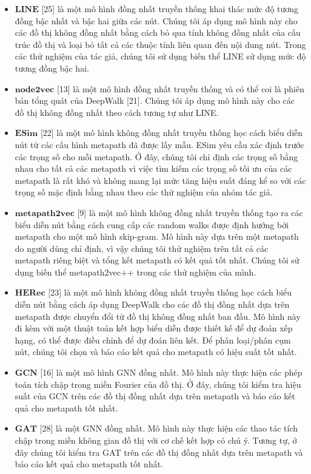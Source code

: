 \begin{itemize}
  \item $\mathbf{LINE}$ [25] là một mô hình đồng nhất truyền thống khai thác mức độ tương đồng bậc nhất và bậc hai giữa các nút. Chúng tôi áp dụng mô hình này cho các đồ thị không đồng nhất bằng cách bỏ qua tính không đồng nhất của cấu trúc đồ thị và loại bỏ tất cả các thuộc tính liên quan đến nội dung nút. Trong các thử nghiệm của tác giả, chúng tôi sử dụng biến thể LINE sử dụng mức độ tương đồng bậc hai.
  \item $\mathbf{node2vec}$ [13] là một mô hình đồng nhất truyền thống và có thể coi là phiên bản tổng quát của DeepWalk [21]. Chúng tôi áp dụng mô hình này cho các đồ thị không đồng nhất theo cách tương tự như LINE.
  \item $\mathbf{ESim}$ [22] là một mô hình không đồng nhất truyền thống học cách biểu diễn nút từ các cấu hình metapath đã được lấy mẫu. ESim yêu cầu xác định trước các trọng số cho mỗi metapath. Ở đây, chúng tôi chỉ định các trọng số bằng nhau cho tất cả các metapath vì việc tìm kiếm  các trọng số tối ưu của các metapath là rất khó và không mang lại mức tăng hiệu suất đáng kể so với các trọng số mặc định bằng nhau theo các thử nghiệm của nhóm tác giả.
  \item $\mathbf{metapath2vec}$ [9] là một mô hình không đồng nhất truyền thống tạo ra các biểu diễn nút bằng cách cung cấp các random walks được định hướng bởi metapath cho một mô hình skip-gram. Mô hình này dựa trên một metapath do người dùng chỉ định, vì vậy chúng tôi thử nghiệm trên tất cả các metapath riêng biệt và tổng kết metapath có kết quả tốt nhất. Chúng tôi sử dụng biến thể metapath2vec++ trong các thử nghiệm của mình. 
  \item $\mathbf{HERec}$ [23] là một mô hình không đồng nhất truyền thống học cách biểu diễn nút bằng cách áp dụng DeepWalk cho các đồ thị đồng nhất dựa trên metapath được chuyển đổi từ đồ thị không đồng nhất ban đầu. Mô hình này đi kèm với một thuật toán kết hợp biểu diễn được thiết kế để dự đoán xếp hạng, có thể được điều chỉnh để dự đoán liên kết. Để phân loại/phân cụm nút, chúng tôi chọn và báo cáo kết quả cho metapath có hiệu suất tốt nhất.
  \item $\mathbf{GCN}$ [16] là một mô hình GNN đồng nhất. Mô hình này thực hiện các phép toán tích chập trong miền Fourier của đồ thị. Ở đây, chúng tôi kiểm tra hiệu suất của GCN trên các đồ thị đồng nhất dựa trên metapath và báo cáo kết quả cho metapath tốt nhất.
  \item $\mathbf{GAT}$ [28] là một GNN đồng nhất. Mô hình này thực hiện các thao tác tích chập trong miền không gian đồ thị với cơ chế kết hợp có chú ý. Tương tự, ở đây chúng tôi kiểm tra GAT trên các đồ thị đồng nhất dựa trên metapath và báo cáo kết quả cho metapath tốt nhất.

\end{itemize}

